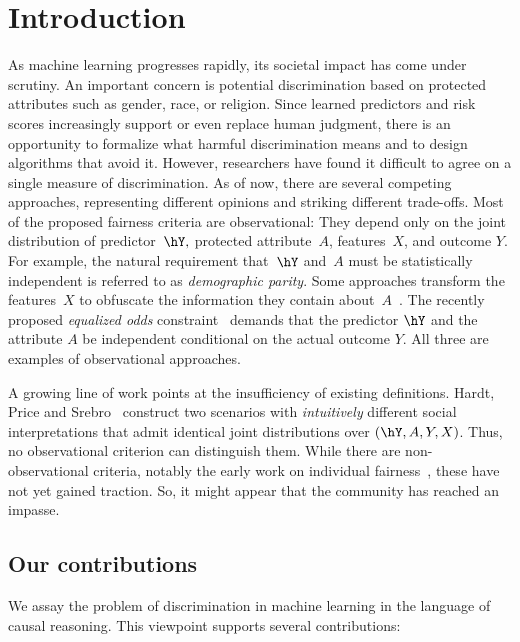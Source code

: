 \section{Introduction}
\label{sec:intro}

As machine learning progresses rapidly, its societal impact has come under
scrutiny. An important concern is potential discrimination based on protected
attributes such as gender, race, or religion. Since learned predictors and risk
scores increasingly support or even replace human judgment, there is an
opportunity to formalize what harmful discrimination means and to design
algorithms that avoid it. However, researchers have found it difficult to agree
on a single measure of discrimination. As of now, there are several competing
approaches, representing different opinions and striking different trade-offs.
Most of the proposed fairness criteria are observational: They depend only on
the joint distribution of predictor~$\hY,$ protected attribute~$A$,
features~$X$, and outcome $Y.$ For example, the natural requirement that~$\hY$
and~$A$ must be statistically independent is referred to as \emph{demographic
parity}. Some approaches transform the features~$X$ to obfuscate the information
they contain about~$A$~\cite{Zemel2013}. The recently proposed \emph{equalized
odds} constraint~\cite{Hardt2016} demands that the predictor $\hY$ and the
attribute $A$ be independent conditional on the actual outcome $Y.$ All three
are examples of observational approaches.

A growing line of work points at the insufficiency of existing definitions.
Hardt, Price and Srebro~\cite{Hardt2016} construct two scenarios with
\emph{intuitively} different social interpretations that admit identical joint
distributions over $(\hY, A, Y, X)$. Thus, no observational criterion can
distinguish them. While there are non-observational criteria, notably the early
work on individual fairness~\cite{Dwork2012}, these have not yet gained
traction.  So, it might appear that the community has reached an impasse.

\subsection{Our contributions}

We assay the problem of discrimination in machine learning in the language of
causal reasoning. This viewpoint supports several contributions:

